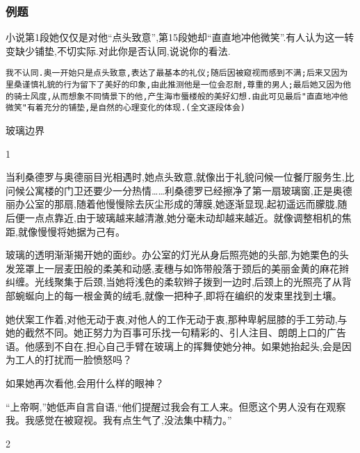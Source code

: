 \documentclass{ctexart}
\newcommand{\nm}{\normalsize}
\renewcommand{\\}{\par}
\begin{document}
\subsubsection{例题}
\\小说第1段她仅仅是对他``点头致意'',第15段她却``直直地冲他微笑''.有人认为这一转变缺少铺垫,不切实际.对此你是否认同,说说你的看法. 
\\ \texttt{我不认同.奥一开始只是点头致意,表达了最基本的礼仪;随后因被窥视而感到不满;后来又因为里桑谨慎礼貌的行为留下了美好的印象,由此推测他是一位会忍耐,尊重的男人;最后她又因为他的骑士风度,从而想象不同情景下的他,产生海市蜃楼般的美好幻想.由此可见最后"直直地冲他微笑"有着充分的铺垫,是自然的心理变化的体现.(全文逐段体会)}
\nm \fangsong 
\\\centerline{玻璃边界}
\\ \begin{center} 1 \end{center} \\当利桑德罗与奥德丽目光相遇时,她点头致意,就像出于礼貌问候一位餐厅服务生,比问候公寓楼的门卫还要少一分热情……利桑德罗已经擦净了第一扇玻璃窗,正是奥德丽办公室的那扇,随着他慢慢除去灰尘形成的薄膜,她逐渐显现,起初遥远而朦胧,随后便一点点靠近,由于玻璃越来越清澈,她分毫未动却越来越近。就像调整相机的焦距,就像慢慢将她据为己有。\\玻璃的透明渐渐揭开她的面纱。办公室的灯光从身后照亮她的头部,为她栗色的头发笼罩上一层麦田般的柔美和动感,麦穗与如饰带般落于颈后的美丽金黄的麻花辫纠缠。光线聚集于后颈,当她将浅色的柔软辫子拨到一边时,后颈上的光照亮了从背部蜿蜒向上的每一根金黄的绒毛,就像一把种子,即将在编织的发束里找到土壤。 \\她伏案工作着,对他无动于衷,对他人的工作无动于衷,那种卑躬屈膝的手工劳动,与她的截然不同。她正努力为百事可乐找一句精彩的、引人注目、朗朗上口的广告语。他感到不自在,担心自己手臂在玻璃上的挥舞使她分神。如果她抬起头,会是因为工人的打扰而一脸愤怒吗？ \\如果她再次看他,会用什么样的眼神？ \\``上帝啊,''她低声自言自语,``他们提醒过我会有工人来。但愿这个男人没有在观察我。我感觉在被窥视。我有点生气了,没法集中精力。'' \\ \begin{center} 2 \end{center} 
\end{document}

